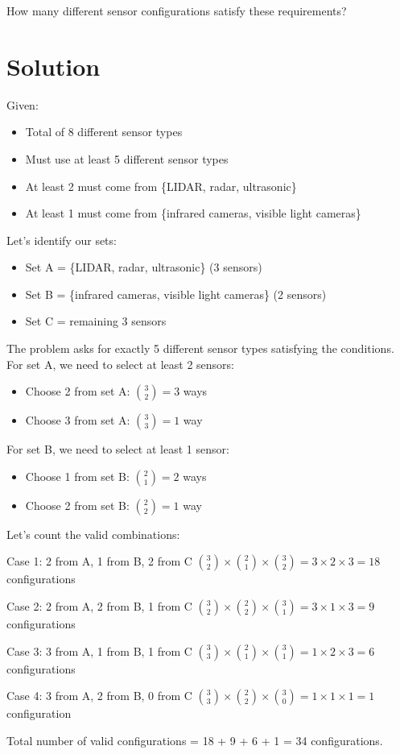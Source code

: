 \documentclass[12pt]{article}
\begin{document}
How many different sensor configurations satisfy these requirements?

\section*{Solution}

Given:
\begin{itemize}
    \item Total of 8 different sensor types
    \item Must use at least 5 different sensor types
    \item At least 2 must come from \{LIDAR, radar, ultrasonic\}
    \item At least 1 must come from \{infrared cameras, visible light cameras\}
\end{itemize}

Let's identify our sets:
\begin{itemize}
    \item Set A = \{LIDAR, radar, ultrasonic\} (3 sensors)
    \item Set B = \{infrared cameras, visible light cameras\} (2 sensors)
    \item Set C = remaining 3 sensors
\end{itemize}

The problem asks for exactly 5 different sensor types satisfying the conditions. 
For set A, we need to select at least 2 sensors:
\begin{itemize}
    \item Choose 2 from set A: $\binom{3}{2} = 3$ ways
    \item Choose 3 from set A: $\binom{3}{3} = 1$ way
\end{itemize}

For set B, we need to select at least 1 sensor:
\begin{itemize}
    \item Choose 1 from set B: $\binom{2}{1} = 2$ ways
    \item Choose 2 from set B: $\binom{2}{2} = 1$ way
\end{itemize}

Let's count the valid combinations:

Case 1: 2 from A, 1 from B, 2 from C
$\binom{3}{2} \times \binom{2}{1} \times \binom{3}{2} = 3 \times 2 \times 3 = 18$ configurations

Case 2: 2 from A, 2 from B, 1 from C
$\binom{3}{2} \times \binom{2}{2} \times \binom{3}{1} = 3 \times 1 \times 3 = 9$ configurations

Case 3: 3 from A, 1 from B, 1 from C
$\binom{3}{3} \times \binom{2}{1} \times \binom{3}{1} = 1 \times 2 \times 3 = 6$ configurations

Case 4: 3 from A, 2 from B, 0 from C
$\binom{3}{3} \times \binom{2}{2} \times \binom{3}{0} = 1 \times 1 \times 1 = 1$ configuration

Total number of valid configurations = 18 + 9 + 6 + 1 = 34 configurations.
\end{document}
